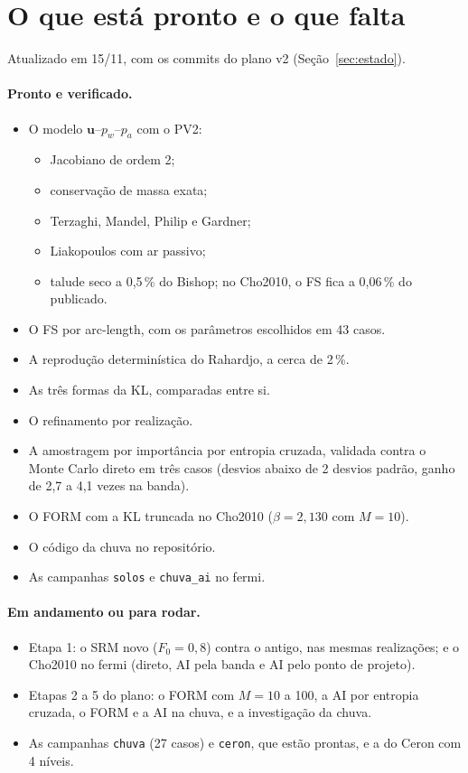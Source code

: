 \section{O que está pronto e o que falta}
\label{sec:pendencias}

Atualizado em 15/11, com os commits do plano v2 (Seção~\ref{sec:estado}).

\paragraph{Pronto e verificado.}
\begin{itemize}
  \item O modelo $\bm u$--$p_w$--$p_a$ com o PV2:
    \begin{itemize}
      \item Jacobiano de ordem 2;
      \item conservação de massa exata;
      \item Terzaghi, Mandel, Philip e Gardner;
      \item Liakopoulos com ar passivo;
      \item talude seco a 0,5\,\% do Bishop; no Cho2010, o FS fica a 0,06\,\% do publicado.
    \end{itemize}
  \item O FS por arc-length, com os parâmetros escolhidos em 43 casos.
  \item A reprodução determinística do Rahardjo, a cerca de 2\,\%.
  \item As três formas da KL, comparadas entre si.
  \item O refinamento por realização.
  \item A amostragem por importância por entropia cruzada, validada contra o Monte Carlo direto em três casos (desvios
    abaixo de 2 desvios padrão, ganho de 2,7 a 4,1 vezes na banda).
  \item O FORM com a KL truncada no Cho2010 ($\beta = 2{,}130$ com $M = 10$).
  \item O código da chuva no repositório.
  \item As campanhas \texttt{solos} e \texttt{chuva\_ai} no fermi.
\end{itemize}

\paragraph{Em andamento ou para rodar.}
\begin{itemize}
  \item Etapa 1: o SRM novo ($F_0 = 0{,}8$) contra o antigo, nas mesmas realizações; e o Cho2010 no fermi (direto, AI
    pela banda e AI pelo ponto de projeto).
  \item Etapas 2 a 5 do plano: o FORM com $M = 10$ a 100, a AI por entropia cruzada, o FORM e a AI na chuva, e a
    investigação da chuva.
  \item As campanhas \texttt{chuva} (27 casos) e \texttt{ceron}, que estão prontas, e a do Ceron com 4 níveis.
\end{itemize}

